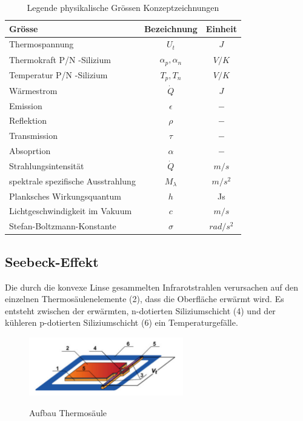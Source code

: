 \begin{table}[H]
	\centering
	\begin{tabular}{l|c|c}
		\rowcolor{gray} Grösse &  Bezeichnung  & Einheit \\
		\hline 
		Thermospannung &  $ U_{t}$ & $J$  \\ 
		\rowcolor{gray} Thermokraft P/N -Silizium  & $\alpha_{p},\alpha_{n}$ & $V/K$\\	
		Temperatur P/N -Silizium &  $T_{p},T_{n}$ & $V/K$ \\
		\rowcolor{gray}Wärmestrom &  $\dot{Q}$ & $J$  \\ 
		Emission & $\epsilon$ & $-$\\	
		\rowcolor{gray}Reflektion &  $\rho $ & $-$ \\
		Transmission & $\tau$ & $-$\\
		\rowcolor{gray}Absoprtion &  $\alpha$ & $-$  \\ 
		Strahlungsintensität & $\dot{Q}$ & $m/s$\\
		\rowcolor{gray}spektrale spezifische Ausstrahlung &  $M_{\lambda }$ & $m/s^2$ \\
		Planksches Wirkungsquantum &  $ h$ & Js \\ 
		\rowcolor{gray} Lichtgeschwindigkeit im Vakuum & $c $ & $ m/s$ \\ 
 		Stefan-Boltzmann-Konstante & $\sigma$ & $ rad/s^2 $ \\ 
	\end{tabular}
	\caption{Legende physikalische Grössen Konzeptzeichnungen}
	\label{tab:Legende Physikalische Grössen} 
\end{table} 


\subsection{Seebeck-Effekt}
\label{subsec:seebeck}
Die durch die konvexe Linse gesammelten Infrarotstrahlen verursachen auf den einzelnen Thermosäulenelemente (2), dass die Oberfläche erwärmt wird. Es entsteht zwischen der erwärmten, n-dotierten Siliziumschicht (4) und der kühleren p-dotierten Siliziumschicht (6) ein Temperaturgefälle.   

\begin{figure}[H]
	\centering
	\includegraphics[width=0.6\textwidth]
	{fig/Mems_Thermopile.PNG}
	\caption[Aufbau Thermosäulenelement]{Aufbau Thermosäule} \protect\cite{AMG8834}
	\label{fig:AufbauThermo}
\end{figure}

